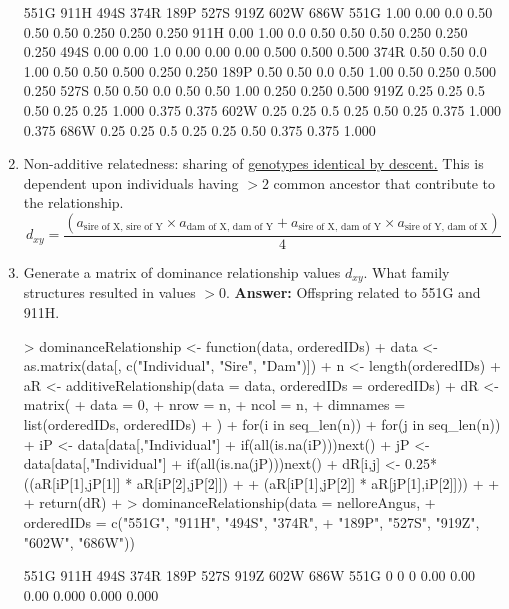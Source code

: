 \documentclass[12pt,a4paper]{paper}
\begin{document}
\begin{enumerate}
\begin{Schunk}
\begin{Soutput}
     551G 911H 494S 374R 189P 527S  919Z  602W  686W
551G 1.00 0.00  0.0 0.50 0.50 0.50 0.250 0.250 0.250
911H 0.00 1.00  0.0 0.50 0.50 0.50 0.250 0.250 0.250
494S 0.00 0.00  1.0 0.00 0.00 0.00 0.500 0.500 0.500
374R 0.50 0.50  0.0 1.00 0.50 0.50 0.500 0.250 0.250
189P 0.50 0.50  0.0 0.50 1.00 0.50 0.250 0.500 0.250
527S 0.50 0.50  0.0 0.50 0.50 1.00 0.250 0.250 0.500
919Z 0.25 0.25  0.5 0.50 0.25 0.25 1.000 0.375 0.375
602W 0.25 0.25  0.5 0.25 0.50 0.25 0.375 1.000 0.375
686W 0.25 0.25  0.5 0.25 0.25 0.50 0.375 0.375 1.000
\end{Soutput}
\end{Schunk}
\item[] Non-additive relatedness: sharing of \underline{genotypes identical by descent.} This is dependent upon individuals having $> 2$ common ancestor that contribute to the relationship.
\begin{equation}
d_{xy} = \frac{(a_{\text{sire of X, sire of Y}} \times a_{\text{dam of X, dam of Y}} + a_{\text{sire of X, dam of Y}} \times a_{\text{sire of Y, dam of X}})}{4}
\end{equation}
\item Generate a matrix of dominance relationship values $d_{xy}$. What family structures resulted in values $> 0$. \textbf{Answer:} Offspring related to 551G and 911H.
\begin{Schunk}
\begin{Sinput}
> dominanceRelationship <- function(data, orderedIDs){
+   data <- as.matrix(data[, c("Individual", "Sire", "Dam")])
+   n <- length(orderedIDs)
+   aR <- additiveRelationship(data = data, orderedIDs = orderedIDs)
+   dR <- matrix(
+     data = 0,
+     nrow = n,
+     ncol = n,
+     dimnames = list(orderedIDs, orderedIDs)
+   )
+   for(i in seq_len(n)){
+     for(j in seq_len(n)){
+         iP <- data[data[,"Individual"] %in% orderedIDs[i],2:3]
+         if(all(is.na(iP))){next()}
+         jP <- data[data[,"Individual"] %in% orderedIDs[j],2:3]
+         if(all(is.na(jP))){next()}
+         dR[i,j] <- 0.25* ((aR[iP[1],jP[1]] * aR[iP[2],jP[2]]) +
+           (aR[iP[1],jP[2]] * aR[jP[1],iP[2]]))
+     }
+   }
+   return(dR)
+ }
> dominanceRelationship(data = nelloreAngus, 
+                       orderedIDs = c("551G", "911H", "494S", "374R",
+                              "189P", "527S", "919Z", "602W", "686W"))
\end{Sinput}
\begin{Soutput}
     551G 911H 494S 374R 189P 527S  919Z  602W  686W
551G    0    0    0 0.00 0.00 0.00 0.000 0.000 0.000

\end{Soutput}
\end{Schunk}
\end{enumerate}
\end{document}
